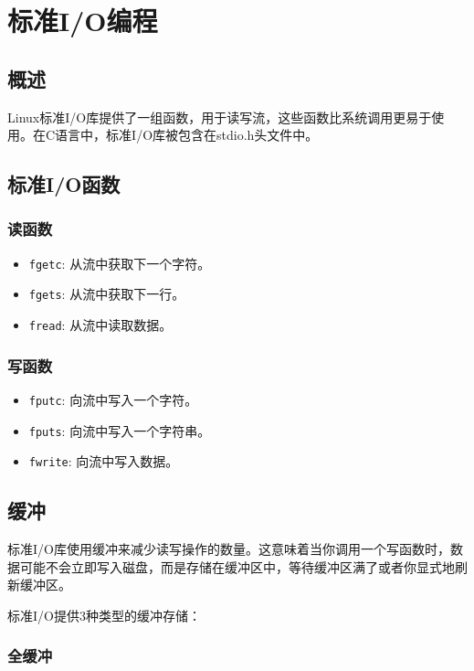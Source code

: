 \documentclass[12pt, a4paper, oneside]{ctexbook}
\numberwithin{figure}{section}
\begin{document}
\section{标准I/O编程}

\subsection{概述}

Linux标准I/O库提供了一组函数，用于读写流，这些函数比系统调用更易于使用。在C语言中，标准I/O库被包含在stdio.h头文件中。

\subsection{标准I/O函数}

\subsubsection{读函数}

\begin{itemize}
    \item \texttt{fgetc}: 从流中获取下一个字符。
    \item \texttt{fgets}: 从流中获取下一行。
    \item \texttt{fread}: 从流中读取数据。
\end{itemize}

\subsubsection{写函数}

\begin{itemize}
    \item \texttt{fputc}: 向流中写入一个字符。
    \item \texttt{fputs}: 向流中写入一个字符串。
    \item \texttt{fwrite}: 向流中写入数据。
\end{itemize}

\subsection{缓冲}

标准I/O库使用缓冲来减少读写操作的数量。这意味着当你调用一个写函数时，数据可能不会立即写入磁盘，而是存储在缓冲区中，等待缓冲区满了或者你显式地刷新缓冲区。

标准I/O提供3种类型的缓冲存储：

\subsubsection{全缓冲}
\end{document}
